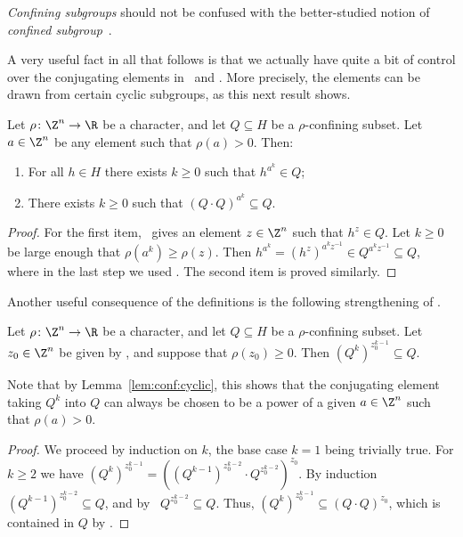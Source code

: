 \begin{rema}
    \emph{Confining subgroups} should not be confused with the better-studied notion of \emph{confined subgroup}~\cite{confined:subgroup}.
\end{rema}

A very useful fact in all that follows is that we actually have quite a bit of control over the conjugating elements in \GetInConf\ and \ProdConf. More precisely, the elements can be drawn from certain cyclic subgroups, as this next result shows.

\begin{lemm}
\label{lem:conf:cyclic}

Let $\rho \colon \Z^n \to \R$ be a character, and let $Q \subseteq H$ be a $\rho$-confining subset. Let $a \in \Z^n$ be any element such that $\rho(a) > 0$. Then:
\begin{enumerate}
\item For all $h \in H$ there exists $k \geq 0$ such that $h^{a^k} \in Q$;
\item There exists $k \geq 0$ such that $(Q \cdot Q)^{a^k} \subseteq Q$.
\end{enumerate}
\end{lemm}

\begin{proof}
For the first item, \GetInConf\ gives an element $z \in \Z^n$ such that $h^z \in Q$. Let $k \geq 0$ be large enough that $\rho(a^k) \geq \rho(z)$. Then $h^{a^k} = (h^z)^{a^k z^{-1}} \in Q^{a^k z^{-1}} \subseteq Q$, where in the last step we used \StayInConf. The second item is proved similarly.
\end{proof}

Another useful consequence of the definitions is the following strengthening of \ProdConf.

\begin{lemm}
\label{lem:products}

Let $\rho \colon \Z^n \to \R$ be a character, and let $Q \subseteq H$ be a $\rho$-confining subset. Let $z_0 \in \Z^n$ be given by \ProdConf, and suppose that $\rho(z_0) \geq 0$. Then $(Q^k)^{z_0^{k-1}} \subseteq Q$.
\end{lemm}

Note that by Lemma~\ref{lem:conf:cyclic}, this shows that the conjugating element taking $Q^k$ into $Q$ can always be chosen to be a power of a given $a \in \Z^n$ such that $\rho(a) > 0$.

\begin{proof}
We proceed by induction on $k$, the base case $k=1$ being trivially true. For $k\ge 2$ we have $(Q^k)^{z_0^{k-1}} = ((Q^{k-1})^{z_0^{k-2}} \cdot Q^{z_0^{k-2}})^{z_0}$. By induction $(Q^{k-1})^{z_0^{k-2}}\subseteq Q$, and by \StayInConf\ $Q^{z_0^{k-2}}\subseteq Q$. Thus, $(Q^k)^{z_0^{k-1}}\subseteq (Q \cdot Q)^{z_0}$, which is contained in $Q$ by \ProdConf.
\end{proof}


